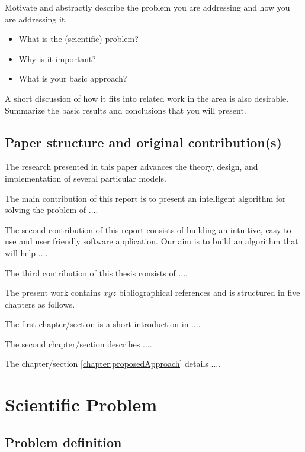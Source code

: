 \documentclass[runningheads,a4paper,11pt]{report}
\begin{document}
Motivate and abstractly describe the problem you are addressing and how you are addressing it. 
\begin{itemize}
	\item What is the (scientific) problem? 
	\item Why is it important? 
	\item What is your basic approach? 
\end{itemize}

A short discussion of how it fits into related work in the area is also desirable. Summarize the basic results and conclusions that you will present. 


\section{Paper structure and original contribution(s)}
\label{section:structure}

The research presented in this paper advances the theory, design, and implementation of several particular models. 

The main contribution of this report is to present an intelligent algorithm for solving the problem of $\ldots$.

The second contribution of this report consists of building an intuitive, easy-to-use and user
friendly software application. Our aim is to build an algorithm that will help $\ldots$.

The third contribution of this thesis consists of $\ldots$.


The present work contains $xyz$ bibliographical references and is structured in five chapters as follows.

The first chapter/section is a short introduction in $\ldots$.

The second chapter/section describes $\ldots$.

The chapter/section \ref{chapter:proposedApproach} details $\ldots$.



\chapter{Scientific Problem}
\label{section:scientificProblem}


\section{Problem definition}
\label{section:problemDefinition}
\end{document}
